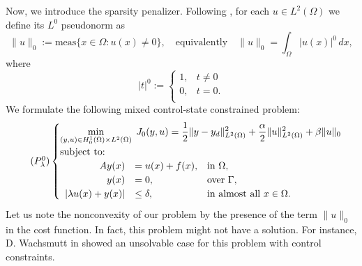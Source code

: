 \documentclass[11pt,a4paper]{amsart}
\newcommand{\om}{\Omega}
\newcommand{\norm}[1]{\lVert #1 \rVert}
\begin{document}
Now, we introduce the sparsity penalizer. Following \cite{}, for each $u\in L^2(\om)$  we define its $L^0$ pseudonorm as
\[
\norm{u}_{0}:=\mbox{meas}\{x\in \om: u(x)\ne 0\}, \quad \text{equivalently} \quad \norm{u}_{0}= \int_\om |u(x)|^0 \,dx ,
\]
where 
$$
|t|^0:=\begin{cases}    
    1,&t\ne 0\\
    0,&t=0.\\
\end{cases}
$$
We formulate the following  mixed control-state constrained problem:
\begin{equation}\label{eq:P_delta_lambda}\tag{$P^0_{\lambda}$}
    \begin{cases}
    \displaystyle\min_{(y,u)\in H_0^1(\om)\times L^2(\om)}\; J_0(y,u)=\frac{1}{2}\norm{y-y_d}^2_{L^2(\om)}+\frac{\alpha}{2}\norm{u}^2_{L^2(\om)}+\beta \norm{u}_0\\
    \mbox{subject to:}\\
    \begin{array}{rll}
     Ay(x)&=u(x) + f(x), &\mbox{in } \om,\\
        y(x)&=0,  &\mbox{over } \Gamma,\\    
         |\lambda u(x)+y(x)|&\leq \delta, &\mbox{in almost all }x\in \Omega.
     \end{array}
    \end{cases}
\end{equation}
Let us note the nonconvexity of our problem by the presence of the term $\norm{u}_0$ in the cost function. In fact, this problem might not have a solution. For instance, D. Wachsmutt  in \cite{wachsmuth19} showed an unsolvable case for this problem with control constraints. 
\end{document}
